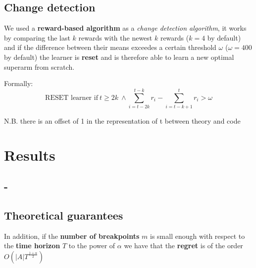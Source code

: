 \subsection{Change detection}

We used a \textbf{reward-based algorithm} as a \textit{change detection algorithm}, it works by comparing the last $k$ rewards with the newest $k$ rewards ($k=4$ by default) and if the difference between their means exceedes a certain threshold $\omega$ ($\omega=400$ by default) the learner is \textbf{reset} and is therefore able to learn a new optimal superarm from scratch.

Formally:
\begin{displaymath}
    \text{RESET learner if} ~ t \geq 2k ~ \land \sum_{i=t-2k}^{t-k} r_i -\sum_{i=t-k+1}^t r_i > \omega
\end{displaymath}

{\scriptsize N.B. there is an offset of 1 in the representation of t between theory and code}

\section{Results}

\subsection{-}

\subsection{Theoretical guarantees}

In addition, if the \textbf{number of breakpoints} $m$ is small enough with respect to the \textbf{time horizon} $T$ to the power of $\alpha$ we have that the \textbf{regret} is of the order $O\left( \vert A \vert T^{\frac{1+\alpha}{2}} \right)$

